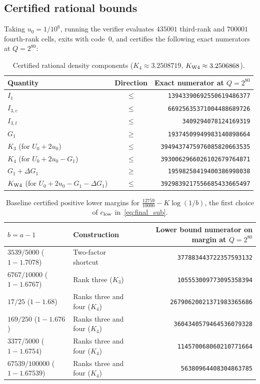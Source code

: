 \documentclass[11pt,reqno]{amsart}
\theoremstyle{remark}
\numberwithin{equation}{section}
\begin{document}
\subsection{Certified rational bounds}
Taking $u_0 = 1/10^6$, running the verifier evaluates $435001$ third-rank and $700001$ fourth-rank cells, exits with code~$0$, and certifies the following exact numerators at $Q = 2^{80}$:

\begin{table}[ht]
\centering
\small
\begin{tabular}{@{}lcr@{}}
\toprule
Quantity & Direction & Exact numerator at $Q=2^{80}$ \\
\midrule
$I_1$ & $\le$ & \texttt{13943390692550619486377} \\
$I_{3,c}$ & $\le$ & \texttt{66925635371004488689726} \\
$I_{3,t}$ & $\le$ & \texttt{3409294078124169319} \\
$G_1$ & $\ge$ & \texttt{19374509949983140898664} \\
$K_3$ (for $U_0+2u_0$) & $\le$ & \texttt{3949437475976085820663535} \\
$K_4$ (for $U_0+2u_0-G_1$) & $\le$ & \texttt{3930062966026102679764871} \\
$G_1+\Delta G_1$ & $\ge$ & \texttt{19598258419400386998038} \\
$K_{\rm W4}$ (for $U_0+2u_0-G_1-\Delta G_1$) & $\le$ & \texttt{3929839217556685433665497} \\
\bottomrule
\end{tabular}
\caption{Certified rational density components ($K_4 \approx 3.2508719$, $K_{\rm W4} \approx 3.2506868$).}
\end{table}

\begin{table}[ht]
\centering
\small
\begin{tabular}{@{}llr@{}}
\toprule
$b = a - 1$ & Construction & Lower bound numerator on margin at $Q=2^{80}$ \\
\midrule
$3539/5000$ ($1-1.7078$) & Two-factor shortcut & \texttt{377883443722357593132} \\
$6767/10000$ ($1-1.6767$) & Rank three ($K_3$) & \texttt{105553009773095358394} \\
$17/25$ ($1-1.68$) & Ranks three and four ($K_4$) & \texttt{26790620021371983365686} \\
$169/250$ ($1-1.676$) & Ranks three and four ($K_4$) & \texttt{3604340579464536079328} \\
$3377/5000$ ($1-1.6754$) & Ranks three and four ($K_4$) & \texttt{114570068060210771664} \\
$67539/100000$ ($1-1.67539$) & Ranks three and four ($K_4$) & \texttt{56380964408304863785} \\
\bottomrule
\end{tabular}
\caption{Baseline certified positive lower margins for $\frac{12759}{10000} - K\log(1/b)$, the first choice of $c_{\rm low}$ in~\eqref{eq:final_sub}.}
\end{table}
\end{document}
